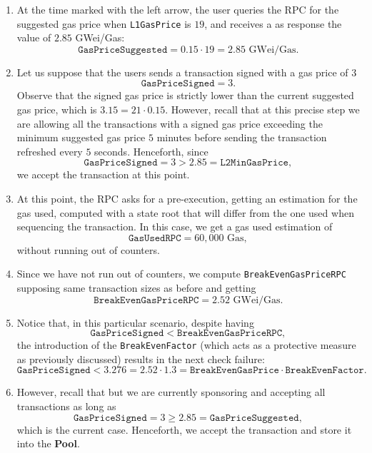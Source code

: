 \begin{enumerate}

\item At the time marked with the left arrow, the user queries the RPC for the suggested gas price when \texttt{L1GasPrice} is $19$, and receives a as response the value of $2.85$ GWei/Gas:
\[
\texttt{GasPriceSuggested} = 0.15 \cdot 19 = 2.85 \text{ GWei/Gas}.
\]

\item Let us suppose that the users sends a transaction signed with a gas price of $3$
\[
\texttt{GasPriceSigned} = 3.
\]
Observe that the signed gas price is strictly lower than the current suggested gas price, which is $3.15 = 21 \cdot 0.15$. However, recall that at this precise step we are allowing all the transactions with a signed gas price exceeding the minimum suggested gas price $5$ minutes before sending the transaction refreshed every $5$ seconds. Henceforth, since
\[
\texttt{GasPriceSigned} = 3 > 2.85 = \texttt{L2MinGasPrice},
\]
we accept the transaction at this point.

\item At this point, the RPC asks for a pre-execution, getting an estimation for the gas used, computed with a state root that will differ from the one used when sequencing the transaction. In this case, we get a gas used estimation of
\[
\texttt{GasUsedRPC} = 60,000 \text{ Gas},
\]
without running out of counters.

\item Since we have not run out of counters, we compute \texttt{BreakEvenGasPriceRPC} supposing same transaction sizes as before and getting
\[
\texttt{BreakEvenGasPriceRPC} = 2.52 \text{ GWei/Gas}.
\]

\item Notice that, in this particular scenario, despite having
\[
\texttt{GasPriceSigned} < \texttt{BreakEvenGasPriceRPC},
\]
the introduction of the \texttt{BreakEvenFactor} (which acts as a protective measure as previously discussed) results in the next check failure:
\[
\texttt{GasPriceSigned} < 3.276 = 2.52 \cdot 1.3 = \texttt{BreakEvenGasPrice} \cdot \texttt{BreakEvenFactor}.
\]

\item However, recall that but we are currently sponsoring and accepting all transactions as long as
\[
\texttt{GasPriceSigned} = 3 \geq 2.85 = \texttt{GasPriceSuggested},
\]
which is the current case. Henceforth, we accept the transaction and store it into the \textbf{Pool}.

\end{enumerate}



